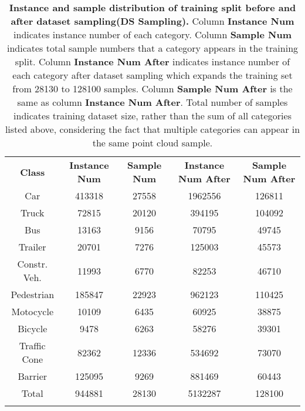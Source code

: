 \documentclass[10pt,twocolumn,letterpaper]{article}
\begin{document}
\bigskip
 \begin{table*}
 \begin{center}
     \begin{tabular}{c|c|c|c|c}     
     \Xhline{0.8pt}
     \textbf{Class} & \textbf{Instance Num} & \textbf{Sample Num} & \textbf{Instance Num After}& \textbf{Sample Num After} \\
    \Xhline{0.8pt}
     Car & 413318 & 27558 & 1962556 & 126811\\
     \hline
     Truck & 72815 & 20120 & 394195 & 104092\\
     \hline
     Bus & 13163 & 9156 & 70795 & 49745 \\
     \hline
     Trailer & 20701 & 7276 & 125003 & 45573 \\
     \hline
     Constr. Veh. & 11993 & 6770 & 82253 & 46710 \\
     \hline
     Pedestrian & 185847 & 22923 & 962123 & 110425 \\
     \hline
     Motocycle & 10109 & 6435 & 60925 & 38875\\
     \hline
     Bicycle & 9478 & 6263 & 58276 & 39301\\
     \hline
     Traffic Cone & 82362 & 12336 & 534692 & 73070\\
     \hline
     Barrier & 125095 & 9269 & 881469 & 60443 \\
\hline
    Total & 944881 & 28130 & 5132287 & 128100 \\
    \Xhline{0.8pt}
 \end{tabular}
 \end{center}
 \caption{\textbf{Instance and sample distribution of training split before and after dataset sampling(DS Sampling).} Column \textbf{Instance Num} indicates instance number of each category. Column \textbf{Sample Num} indicates total sample numbers that a category appears in the training split. Column \textbf{Instance Num After} indicates instance number of each category after dataset sampling which expands the training set from 28130 to 128100 samples. Column \textbf{Sample Num After} is the same as column \textbf{Instance Num After}. Total number of samples indicates training dataset size, rather than the sum of all categories listed above, considering the fact that multiple categories can appear in the same point cloud sample.}
 \label{table:inssamnum}
 \end{table*}
 \bigskip
 
\end{document}
